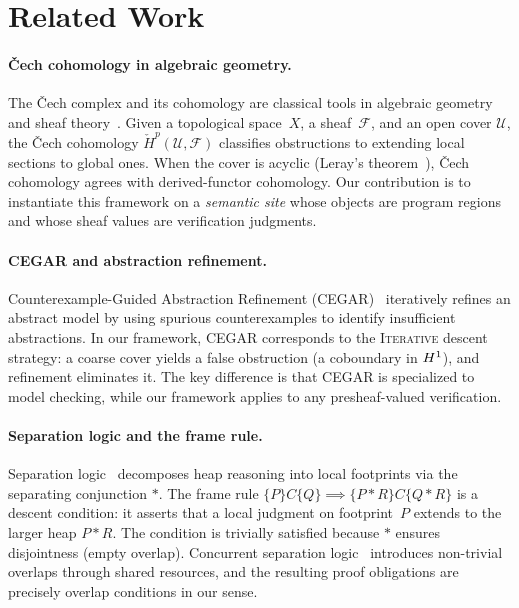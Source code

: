 \documentclass[11pt]{article}
\begin{document}
\section{Related Work}\label{sec:related}

\paragraph{\v{C}ech cohomology in algebraic geometry.}
The \v{C}ech complex and its cohomology are classical tools in algebraic
geometry and sheaf theory~\cite{hartshorne1977,godement1958,serre1955}.
Given a topological space~$X$, a sheaf~$\mathcal{F}$, and an open cover
$\mathcal{U}$, the \v{C}ech cohomology $\check{H}^p(\mathcal{U},
\mathcal{F})$ classifies obstructions to extending local sections to global
ones.  When the cover is acyclic (Leray's theorem~\cite{leray1950}),
\v{C}ech cohomology agrees with derived-functor cohomology.  Our
contribution is to instantiate this framework on a \emph{semantic site}
whose objects are program regions and whose sheaf values are verification
judgments.

\paragraph{CEGAR and abstraction refinement.}
Counterexample-Guided Abstraction Refinement
(CEGAR)~\cite{clarke2000,clarke2003} iteratively refines an abstract model
by using spurious counterexamples to identify insufficient abstractions.
In our framework, CEGAR corresponds to the \textsc{Iterative} descent
strategy: a coarse cover yields a false obstruction (a coboundary in
$H^{1}$), and refinement eliminates it.  The key difference is that
CEGAR is specialized to model checking, while our framework applies to
any presheaf-valued verification.

\paragraph{Separation logic and the frame rule.}
Separation logic~\cite{reynolds2002,ohearn2001,ishtiaq2001} decomposes heap
reasoning into local footprints via the separating conjunction $\ast$.  The
frame rule $\{P\}C\{Q\} \implies \{P \ast R\}C\{Q \ast R\}$ is a descent
condition: it asserts that a local judgment on footprint~$P$ extends to the
larger heap $P \ast R$.  The condition is trivially satisfied because
$\ast$ ensures disjointness (empty overlap).  Concurrent separation
logic~\cite{ohearn2007,brookes2007} introduces non-trivial overlaps through
shared resources, and the resulting proof obligations are precisely overlap
conditions in our sense.
\end{document}
